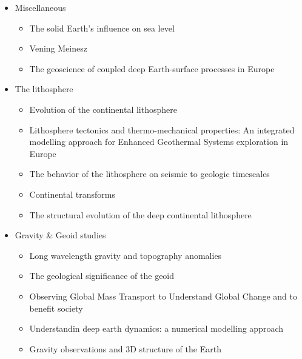 \begin{itemize}
\item Miscellaneous
   \begin{itemize}
   \item The solid Earth's influence on sea level \cite{conr13}  
   \item Vening Meinesz \cite{vlaa89}
   \item The geoscience of coupled deep Earth-surface processes in Europe \cite{clzb07}
   \end{itemize}

\item The lithosphere
   \begin{itemize}
   \item [\twothousandfive] Evolution of the continental lithosphere \cite{slee05}
   \item [\twothousandten] Lithosphere tectonics and thermo-mechanical properties: An integrated modelling
         approach for Enhanced Geothermal Systems exploration in Europe \cite{clvz10}
   \item [\twothousandthirteen] The behavior of the lithosphere on seismic to geologic timescales \cite{wazh13}
   \item [\twothousandfourteen] Continental transforms \cite{noto14}
   \item [\twothousandseventeen] The structural evolution of the deep continental lithosphere \cite{comm17}
   \end{itemize}

\item Gravity \& Geoid studies
   \begin{itemize}
   \item Long wavelength gravity and topography anomalies \cite{wada81}
   \item The geological significance of the geoid \cite{chas85}
   \item Observing Global Mass Transport to Understand Global Change and to benefit society \cite{pabb15}
   \item Understandin deep earth dynamics: a numerical modelling approach \cite{siag17}
   \item Gravity observations and 3D structure of the Earth \cite{ricl06}\\
   \end{itemize}


\end{itemize}
